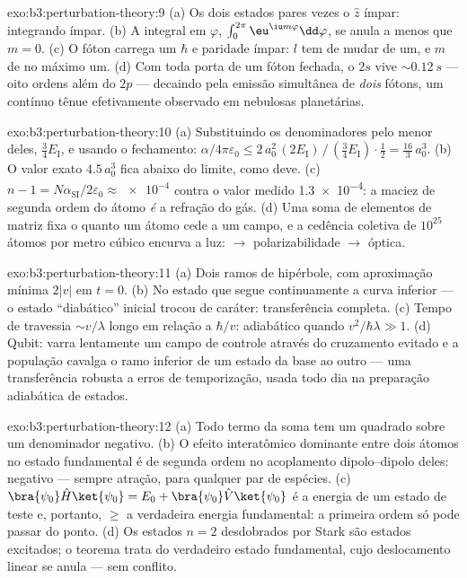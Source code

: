 \begin{solution}{exo:b3:perturbation-theory:9}
(a) Os dois estados pares vezes o $\hat z$ ímpar: integrando ímpar. (b)
A integral em $\varphi$, $\int_0^{2\pi}\eu^{\iu m\varphi}\dd\varphi$,
se anula a menos que $m = 0$. (c) O fóton carrega um $\hbar$ e paridade
ímpar: $l$ tem de mudar de um, e $m$ de no máximo um. (d) Com toda
porta de um fóton fechada, o $2s$ vive $\sim\qty{0.12}{s}$ --- oito
ordens além do $2p$ --- decaindo pela emissão simultânea de
\emph{dois} fótons, um contínuo tênue efetivamente observado em
nebulosas planetárias.
\end{solution}

\begin{solution}{exo:b3:perturbation-theory:10}
(a) Substituindo os denominadores pelo menor deles, $\tfrac34
E_{\text{I}}$, e usando o fechamento: $\alpha/4\pi\varepsilon_0 \le
2\,a_0^2\,(2E_{\text{I}})\,/\,(\tfrac34 E_{\text{I}})\cdot\tfrac12
= \tfrac{16}3\,a_0^3$. (b) O valor exato $4.5\,a_0^3$ fica abaixo do
limite, como deve. (c) $n - 1 = N\alpha_{\text{SI}}/2\varepsilon_0
\approx \num{e-4}$ contra o valor medido \num{1.3e-4}: a maciez de
segunda ordem do átomo \emph{é} a refração do gás. (d) Uma soma de
elementos de matriz fixa o quanto um átomo cede a um campo, e a
cedência coletiva de $10^{25}$ átomos por metro cúbico encurva a luz:
 $\to$ polarizabilidade $\to$ óptica.
\end{solution}

\begin{solution}{exo:b3:perturbation-theory:11}
(a) Dois ramos de hipérbole, com aproximação mínima $2|v|$ em $t = 0$.
(b) No estado que segue continuamente a curva inferior --- o estado
``diabático'' inicial trocou de caráter: transferência completa. (c)
Tempo de travessia $\sim v/\lambda$ longo em relação a
$\hbar/v$: adiabático quando $v^2/\hbar\lambda \gg 1$. (d) Qubit:
varra lentamente um campo de controle através do cruzamento evitado e a
população cavalga o ramo inferior de um estado da base ao outro --- uma
transferência robusta a erros de temporização, usada todo dia na
preparação adiabática de estados.
\end{solution}

\begin{solution}{exo:b3:perturbation-theory:12}
(a) Todo termo da soma tem um quadrado sobre um denominador negativo.
(b) O efeito interatômico dominante entre dois átomos no estado
fundamental é de segunda ordem no acoplamento dipolo--dipolo deles:
negativo --- sempre atração, para qualquer par de espécies. (c)
$\bra{\psi_0}\hat H\ket{
\psi_0} = E_0 + \bra{\psi_0}\hat V\ket{\psi_0}$ é a energia de um
estado de teste e, portanto, $\ge$ a verdadeira energia fundamental: a
primeira ordem só pode passar do ponto. (d) Os estados $n = 2$
desdobrados por Stark são estados excitados; o teorema trata do
verdadeiro estado fundamental, cujo deslocamento linear se anula ---
sem conflito.
\end{solution}

